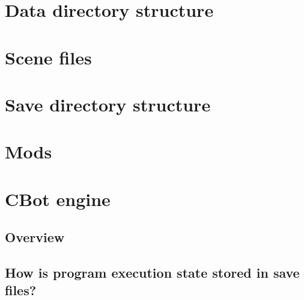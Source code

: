 \chapter{Data directory structure}
\chapter{Scene files}
\chapter{Save directory structure}
\chapter{Mods}
\chapter{CBot engine}
\section{Overview}
\section{How is program execution state stored in save files?}